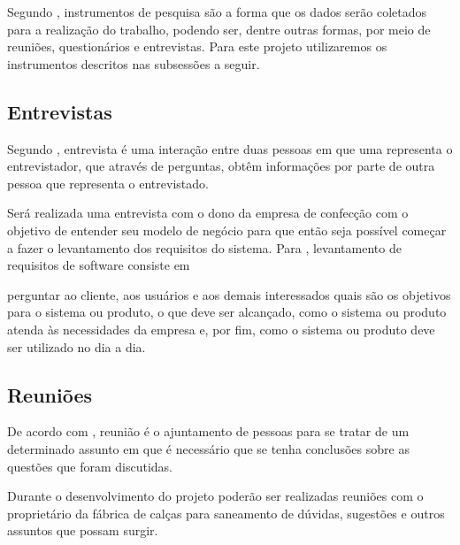 \par Segundo , instrumentos de pesquisa são a
forma que os dados serão coletados para a realização do trabalho, podendo ser,
dentre outras formas, por meio de reuniões, questionários e entrevistas. Para
este projeto utilizaremos os instrumentos descritos nas subsessões a seguir.

\subsection{Entrevistas}
\par Segundo , entrevista é
uma interação entre duas pessoas em que uma representa o entrevistador, 
que através de perguntas, obtêm informações por parte de outra pessoa que
representa o entrevistado.





\par Será realizada uma entrevista com o dono da empresa de confecção com o
objetivo de entender seu modelo de negócio para que então seja possível começar
a fazer o levantamento dos requisitos do sistema. Para
, levantamento de requisitos de
software consiste em

\begin{citacao}
perguntar ao cliente, aos usuários e aos demais interessados quais são os
objetivos para o sistema ou produto, o que deve ser alcançado, como o sistema ou
produto atenda às necessidades da empresa e, por fim, como o sistema ou produto
deve ser utilizado no dia a dia.
\end{citacao} 


\subsection{Reuniões}
\par De acordo com , reunião é o ajuntamento de
pessoas para se tratar de um determinado assunto em que é necessário que se
tenha conclusões sobre as questões que foram discutidas.

\par Durante o desenvolvimento do projeto poderão ser realizadas reuniões
com o proprietário da fábrica de calças para saneamento de dúvidas, sugestões e
outros assuntos que possam surgir.

